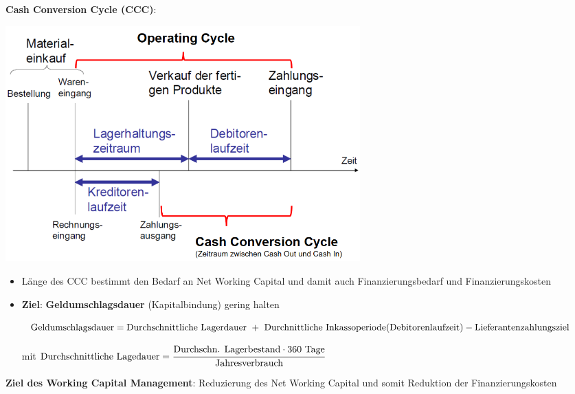\textbf{Cash Conversion Cycle (CCC)}:
\begin{center}
	\includegraphics[width=0.6\textwidth]{images/ccc.png}
\end{center}
\begin{itemize}
	\item Länge des CCC bestimmt den Bedarf an Net Working Capital und damit auch Finanzierungsbedarf und Finanzierungskosten
	\item \textbf{Ziel}: \textbf{Geldumschlagsdauer} (Kapitalbindung) gering halten
	
	$\text{Geldumschlagsdauer}=\text{Durchschnittliche Lagerdauer } + \text{ Durchnittliche Inkassoperiode} \newline \text{(Debitorenlaufzeit)}-\text{Lieferantenzahlungsziel}$
	
	mit $\text{Durchschnittliche Lagedauer}=\cfrac{\text{Durchschn. Lagerbestand} \cdot 360 \text{ Tage}}{\text{Jahresverbrauch}}$
\end{itemize}
\bigskip
\textbf{Ziel des Working Capital Management}: Reduzierung des Net Working Capital und somit Reduktion der Finanzierungskosten

